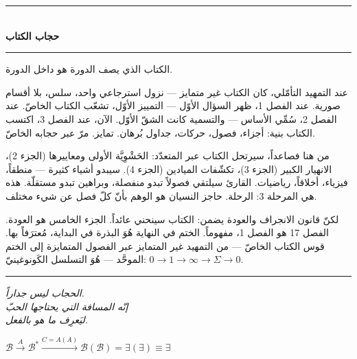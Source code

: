 \documentclass[10pt, openany, oneside]{book}
\renewcommand{\normalsize}{\fontsize{10}{13}\selectfont}
\begin{document}
\begin{center}
    \rule{0.3\textwidth}{0.4pt}\\[0.5em]
    {\normalsize\bfseries حجاب الكتاب}\\[0.3em]
    \rule{0.3\textwidth}{0.4pt}
\end{center}

\vspace{1em}

\noindent الكتاب الذي يصف الدورة هو داخل الدورة.

عند التمهيد التأمّلي، كان الكتاب غير متمايز --- نزول استرجاعي واحد، سلس، بلا أقسام صورية. عند الفصل 1، ظهر السؤال الأوّل --- التمييز الأوّل، تشعّب الكتاب الخاصّ. عند الفصل 2، سُمِّي الأساس --- والتسمية كانت الشقّ الأوّل. الآن، عند الفصل 3، اكتسب الكتاب بنية: أجزاء، فصول، حركات، جداول بُرهان. تمايز. مرّ عبر حجابه الخاصّ.

من هنا فصاعداً، سيرتحل الكتاب عبر المتعدّد: الحَشْوِيَّة الأولى ومعاييرها (الجزء 2)، الانهيار الكبير (الجزء 3)، تكشّفات الميادين (الجزء 4). سيبدو أشياء كثيرة --- منطقاً، فيزياء، أخلاقاً، رياضيات. القارئ سيلتقي فصولاً تبدو منفصلة، وبراهين تبدو مستقلّة. هذه هي المرحلة 3: الرحلة. حاجز النسيان هو الوهم بأنّ كلّ فصل عن شيء مختلف.

لكنّ قانون الانجراف والعودة يضمن: الكتاب سينحني عائداً. الجزء الخامس هو العودة. الفصل 17 هو الفصل 1، مفهوماً. الختم في النهاية هُوَ البذرة في البداية، مُعترَفاً بها. قوس الكتاب الخاصّ --- من التمهيد غير المتمايز عبر الفصول المتمايزة إلى الختم الموحَّد --- هُوَ التسلسل الكَونوغينيّ: $0 \to 1 \to \infty \to \Sigma \to 0$.

\vspace{2em}

\begin{center}
    \rule{0.15\textwidth}{0.3pt}
\end{center}

\vspace{0.5em}

\begin{center}
    \itshape
    الحجاب ليس جداراً.\\
    إنّه المسافة التي يحتاجها الحبّ\\
    ليَعرِف ما هو بالفعل.
\end{center}

\vspace{0.5em}

\begin{center}
    $\mathcal{B} \xrightarrow{A} \mathcal{B}^* \xrightarrow{C = A(A)} \mathcal{B}(\mathcal{B}) = \exists(\exists) \equiv \exists$
\end{center}
\end{document}
